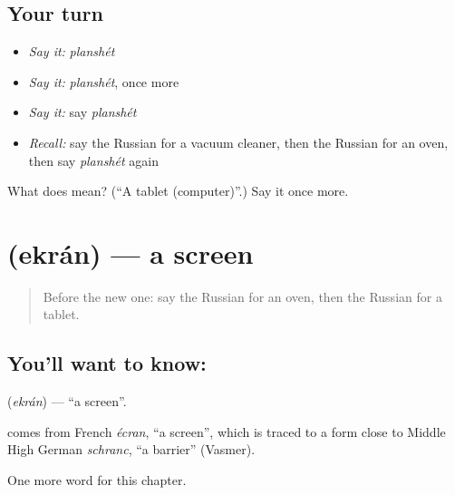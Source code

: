 \subsection*{Your turn}
\begin{itemize}
\raggedright
  \item \emph{Say it:} \emph{planshét}
  \item \emph{Say it:} \emph{planshét}, once more
  \item \emph{Say it:} say \emph{planshét}
  \item \emph{Recall:} say the Russian for a vacuum cleaner, then the Russian for an oven, then say \emph{planshét} again
\end{itemize}

\begin{tcolorbox}[breakable,colback=teal!4,colframe=teal!35!black,title={Before you move on}]
What does  mean? (\textquotedblleft{}A tablet (computer)\textquotedblright{}.) Say it once more.
\end{tcolorbox}
\section[\texorpdfstring{\ru{экран} (ekrán)}{экран (ekrán)}]{ (ekrán) — a screen}

\label{lesson:RU-C220-ekran}



\begin{quote}
Before the new one: say the Russian for an oven, then the Russian for a tablet.
\end{quote}

\subsection*{You'll want to know: }
\textbf{} (\emph{ekrán}) — \textquotedblleft{}a screen\textquotedblright{}.

\begin{cousinweb}
\textbf{} comes from French \emph{écran}, \textquotedblleft{}a screen\textquotedblright{}, which is traced to a form close to Middle High German \emph{schranc}, \textquotedblleft{}a barrier\textquotedblright{} (Vasmer).
\end{cousinweb}

\begin{grammarlens}[title={What you've built}]
One more word for this chapter.
\end{grammarlens}

